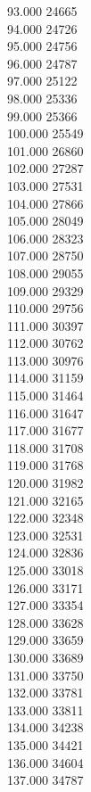 { 93.000	24665 \\
 94.000	24726 \\
 95.000	24756 \\
 96.000	24787 \\
 97.000	25122 \\
 98.000	25336 \\
 99.000	25366 \\
 100.000	25549 \\
 101.000	26860 \\
 102.000	27287 \\
 103.000	27531 \\
 104.000	27866 \\
 105.000	28049 \\
 106.000	28323 \\
 107.000	28750 \\
 108.000	29055 \\
 109.000	29329 \\
 110.000	29756 \\
 111.000	30397 \\
 112.000	30762 \\
 113.000	30976 \\
 114.000	31159 \\
 115.000	31464 \\
 116.000	31647 \\
 117.000	31677 \\
 118.000	31708 \\
 119.000	31768 \\
 120.000	31982 \\
 121.000	32165 \\
 122.000	32348 \\
 123.000	32531 \\
 124.000	32836 \\
 125.000	33018 \\
 126.000	33171 \\
 127.000	33354 \\
 128.000	33628 \\
 129.000	33659 \\
 130.000	33689 \\
 131.000	33750 \\
 132.000	33781 \\
 133.000	33811 \\
 134.000	34238 \\
 135.000	34421 \\
 136.000	34604 \\
 137.000	34787 \\
}
